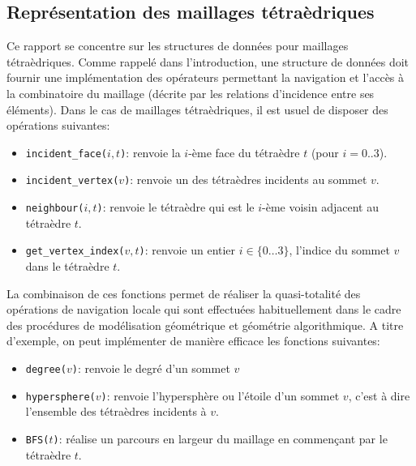 \subsection{Représentation des maillages tétraèdriques}
\label{representation_maillages_tetra}
\noindent
Ce rapport se concentre sur les structures de données pour maillages tétraèdriques. Comme rappelé dans l'introduction, une structure de données doit fournir une implémentation des opérateurs permettant la navigation et l'accès à la combinatoire du maillage (décrite par les relations d'incidence entre ses éléments). Dans le cas de maillages tétraèdriques, il est usuel de disposer des opérations suivantes:
\begin{itemize}
\item \texttt{incident\_face($i,t$)}: renvoie la $i$-ème face du tétraèdre $t$ (pour $i=0..3$).
\item \texttt{incident\_vertex($v$)}: renvoie un des tétraèdres incidents au sommet $v$.
\item \texttt{neighbour($i, t$)}: renvoie le tétraèdre qui est le $i$-ème voisin adjacent au tétraèdre $t$. 
\item \texttt{get\_vertex\_index($v,t$)}: renvoie un entier $i\in\{0 \ldots 3 \}$, l'indice du sommet $v$ dans le tétraèdre $t$.
\end{itemize}
\noindent
La combinaison de ces fonctions permet de réaliser la quasi-totalité des opérations de navigation locale qui sont effectuées habituellement
dans le cadre des procédures de modélisation géométrique et géométrie algorithmique. A titre d'exemple, on peut implémenter de manière efficace les fonctions suivantes:
\begin{itemize}
\item \texttt{degree($v$)}: renvoie le degré d'un sommet $v$
\item \texttt{hypersphere($v$)}: renvoie l'hypersphère ou l'étoile d'un sommet $v$, c'est à dire l'ensemble des tétraèdres incidents à $v$.
\item \texttt{BFS($t$)}: réalise un parcours en largeur du maillage en commen\c cant par le tétraèdre $t$.
\end{itemize}
